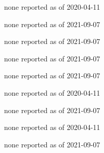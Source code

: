 
\begin{DoxyRefList}
\item[\label{bug__bug000001}%
\Hypertarget{bug__bug000001}%
Namespace \hyperlink{namespacecell}{cell} ]none reported as of 2020-\/04-\/11  
\item[\label{bug__bug000002}%
\Hypertarget{bug__bug000002}%
Class \hyperlink{classCircle}{Circle} ]none reported as of 2021-\/09-\/07  
\item[\label{bug__bug000007}%
\Hypertarget{bug__bug000007}%
Namespace \hyperlink{namespacefusionGeometry}{fusion\+Geometry} ]none reported as of 2021-\/09-\/07  
\item[\label{bug__bug000003}%
\Hypertarget{bug__bug000003}%
Namespace \hyperlink{namespacelaser}{laser} ]none reported as of 2021-\/09-\/07  
\item[\label{bug__bug000004}%
\Hypertarget{bug__bug000004}%
Class \hyperlink{classLine}{Line} ]none reported as of 2021-\/09-\/07  
\item[\label{bug__bug000009}%
\Hypertarget{bug__bug000009}%
Namespace \hyperlink{namespaceranger}{ranger} ]none reported as of 2020-\/04-\/11  
\item[\label{bug__bug000006}%
\Hypertarget{bug__bug000006}%
Class \hyperlink{classRanger}{Ranger} ]none reported as of 2021-\/09-\/07  
\item[\label{bug__bug000008}%
\Hypertarget{bug__bug000008}%
Class \hyperlink{classRangerFusionInterface}{Ranger\+Fusion\+Interface} ]none reported as of 2020-\/04-\/11  
\item[\label{bug__bug000010}%
\Hypertarget{bug__bug000010}%
Namespace \hyperlink{namespacesonar}{sonar} ]none reported as of 2021-\/09-\/07 
\end{DoxyRefList}